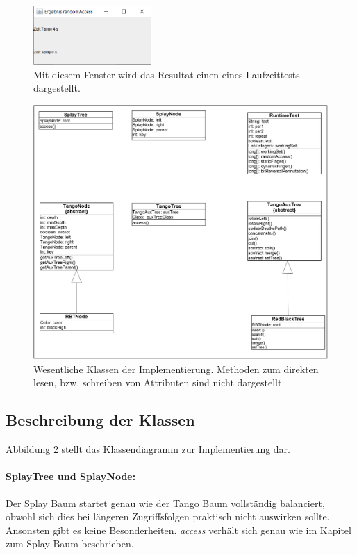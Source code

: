 \documentclass[a4paper,12pt]{article}
\begin{document}
\begin{figure}[H]
	\centering
	\includegraphics[width=0.4\textwidth]{Medien/laufzeittest/ResultGUI}
	\caption{Mit diesem Fenster wird das Resultat einen eines Laufzeittests dargestellt.}
	\label{fig:ResultGUI}
\end{figure}


\begin{figure}[H]
	\centering
	\includegraphics[width=1\textwidth]{Medien/laufzeittest/klassen}
	\caption{Wesentliche Klassen der Implementierung. Methoden zum direkten lesen, bzw. schreiben von Attributen sind nicht dargestellt. }
	\label{fig:klassen}
\end{figure}

\subsection{Beschreibung der Klassen }
Abbildung \ref{fig:klassen} stellt das Klassendiagramm zur Implementierung dar.
\paragraph{SplayTree und SplayNode:}
Der Splay Baum startet genau wie der Tango Baum vollständig balanciert, obwohl sich dies bei längeren Zugriffsfolgen praktisch nicht auswirken sollte. Ansonsten gibt es keine Besonderheiten. \textit{access} verhält sich genau wie im Kapitel zum Splay Baum beschrieben. 
\end{document}
